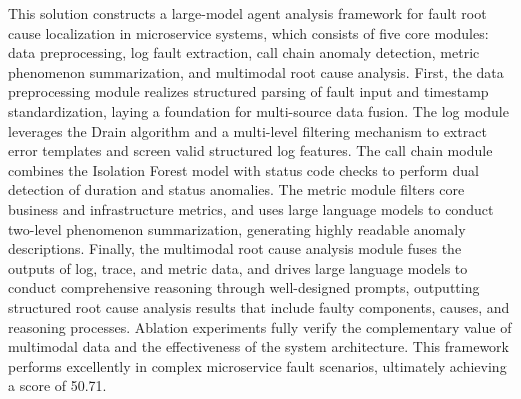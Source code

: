 \documentclass[10pt]{article}
\begin{document}
This solution constructs a large-model agent analysis framework for fault root cause localization in microservice systems, which consists of five core modules: data preprocessing, log fault extraction, call chain anomaly detection, metric phenomenon summarization, and multimodal root cause analysis. First, the data preprocessing module realizes structured parsing of fault input and timestamp standardization, laying a foundation for multi-source data fusion. The log module leverages the Drain algorithm and a multi-level filtering mechanism to extract error templates and screen valid structured log features. The call chain module combines the Isolation Forest model with status code checks to perform dual detection of duration and status anomalies. The metric module filters core business and infrastructure metrics, and uses large language models to conduct two-level phenomenon summarization, generating highly readable anomaly descriptions. Finally, the multimodal root cause analysis module fuses the outputs of log, trace, and metric data, and drives large language models to conduct comprehensive reasoning through well-designed prompts, outputting structured root cause analysis results that include faulty components, causes, and reasoning processes. Ablation experiments fully verify the complementary value of multimodal data and the effectiveness of the system architecture. This framework performs excellently in complex microservice fault scenarios, ultimately achieving a score of 50.71.

% 

\end{document}
